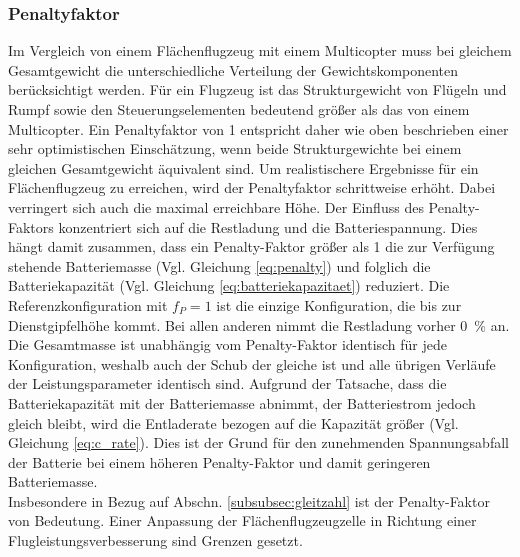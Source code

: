 \subsubsection{Penaltyfaktor}
\label{subsubsec:f_p}
Im Vergleich von einem Flächenflugzeug mit einem Multicopter muss bei gleichem Gesamtgewicht die unterschiedliche Verteilung der Gewichtskomponenten berücksichtigt werden. Für ein Flugzeug ist das Strukturgewicht von Flügeln und Rumpf sowie den Steuerungselementen bedeutend größer als das von einem Multicopter. Ein Penaltyfaktor von 1 entspricht daher wie oben beschrieben einer sehr optimistischen Einschätzung, wenn beide Strukturgewichte bei einem gleichen Gesamtgewicht äquivalent sind. Um realistischere Ergebnisse für ein Flächenflugzeug zu erreichen, wird der Penaltyfaktor schrittweise erhöht. Dabei verringert sich auch die maximal erreichbare Höhe.
Der Einfluss des Penalty-Faktors konzentriert sich auf die Restladung und die Batteriespannung. Dies hängt damit zusammen, dass ein Penalty-Faktor größer als 1 die zur Verfügung stehende Batteriemasse (Vgl. Gleichung \ref{eq:penalty}) und folglich die Batteriekapazität (Vgl. Gleichung \ref{eq:batteriekapazitaet}) reduziert. Die Referenzkonfiguration mit \ensuremath{f_P = 1} ist die einzige Konfiguration, die bis zur Dienstgipfelhöhe kommt. Bei allen anderen nimmt die Restladung vorher \SI{0}{\%} an. Die Gesamtmasse ist unabhängig vom Penalty-Faktor identisch für jede Konfiguration, weshalb auch der Schub der gleiche ist und alle übrigen Verläufe der Leistungsparameter identisch sind. 
Aufgrund der Tatsache, dass die Batteriekapazität mit der Batteriemasse abnimmt, der Batteriestrom jedoch gleich bleibt, wird die Entladerate bezogen auf die Kapazität größer (Vgl. Gleichung \ref{eq:c_rate}). Dies ist der Grund für den zunehmenden Spannungsabfall der Batterie bei einem höheren Penalty-Faktor und damit geringeren Batteriemasse.\\
Insbesondere in Bezug auf Abschn. \ref{subsubsec:gleitzahl} ist der Penalty-Faktor von Bedeutung. Einer Anpassung der Flächenflugzeugzelle in Richtung einer Flugleistungsverbesserung sind Grenzen gesetzt. 


